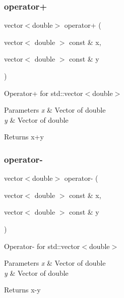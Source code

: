 \subsubsection{\texorpdfstring{operator+}{operator+}}
{\footnotesize\ttfamily vector$<$double$>$ operator+ (\begin{DoxyParamCaption}\item[{vector$<$ double $>$ const \&}]{x,  }\item[{vector$<$ double $>$ const \&}]{y }\end{DoxyParamCaption})\hspace{0.3cm}{\ttfamily [friend]}}

Operator+ for std\+::vector$<$double$>$ 
\begin{DoxyParams}{Parameters}
{\em x} & Vector of double \\
\hline
{\em y} & Vector of double \\
\hline
\end{DoxyParams}
\begin{DoxyReturn}{Returns}
x+y 
\end{DoxyReturn}
\mbox{\label{class_function_a22b6097cd533334d1f39264479bd5447}} 
\subsubsection{\texorpdfstring{operator-\/}{operator-}}
{\footnotesize\ttfamily vector$<$double$>$ operator-\/ (\begin{DoxyParamCaption}\item[{vector$<$ double $>$ const \&}]{x,  }\item[{vector$<$ double $>$ const \&}]{y }\end{DoxyParamCaption})\hspace{0.3cm}{\ttfamily [friend]}}

Operator-\/ for std\+::vector$<$double$>$ 
\begin{DoxyParams}{Parameters}
{\em x} & Vector of double \\
\hline
{\em y} & Vector of double \\
\hline
\end{DoxyParams}
\begin{DoxyReturn}{Returns}
x-\/y 
\end{DoxyReturn}
\mbox{\label{class_function_a51d95877d503ae53e2a0c2d4bf4da926}} 
